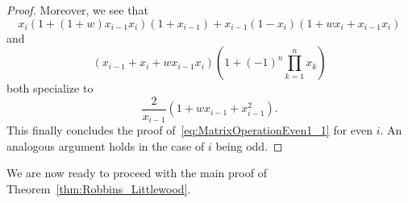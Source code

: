 \documentclass[10pt,a4paper]{article}
\theoremstyle{definition}
\begin{document}
\begin{proof}
		Moreover, we see that
		\begin{equation*}
			x_i (1+(1+w) x_{i-1} x_i) (1+x_{i-1}) + x_{i-1} (1-x_i) (1+w x_i+x_{i-1} x_i)  
		\end{equation*}
		and
		\begin{equation*}
			(x_{i-1}+x_i+w x_{i-1} x_i) \left(1+ (-1)^n \prod_{k=1}^{n} x_k \right)
		\end{equation*}
		both specialize to
		\begin{equation*}
			\frac{2}{x_{i-1}} (1+ w x_{i-1}+ x_{i-1}^2).
		\end{equation*}
		This finally concludes the proof of~\eqref{eq:MatrixOperationEven1_1} for even $i$. An analogous argument holds in the case of $i$ being odd.
	\end{proof}
	
	We are now ready to proceed with the main proof of Theorem~\ref{thm:Robbins_Littlewood}.
	
\end{document}
